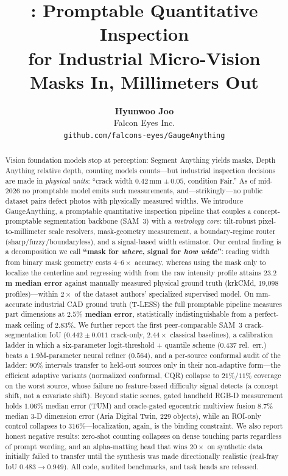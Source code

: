 \documentclass[11pt]{article}
\title{\textbf{\ours: Promptable Quantitative Inspection\\for Industrial Micro-Vision}\\
\large Masks In, Millimeters Out}
\author{%
  \textbf{Hyunwoo Joo}\\
  Falcon Eyes Inc.\\
  \texttt{github.com/falcons-eyes/GaugeAnything}
}
\date{}
\newcommand{\ours}{GaugeAnything}
\newcommand{\um}{\,\textmu m}
\begin{document}
\maketitle

\begin{abstract}
Vision foundation models stop at perception: Segment Anything yields masks, Depth Anything
relative depth, counting models counts---but industrial inspection decisions are made in
\emph{physical units}: ``crack width $0.42$\,mm $\pm\,0.05$, condition Fair.'' As of mid-2026 no
promptable model emits such measurements, and---strikingly---no public dataset pairs defect
photos with physically measured widths. We introduce \ours, a promptable quantitative
inspection pipeline that couples a concept-promptable segmentation backbone (SAM~3) with a
\emph{metrology core}: tilt-robust pixel-to-millimeter scale resolvers, mask-geometry
measurement, a boundary-regime router (sharp/fuzzy/boundaryless), and a signal-based width
estimator. Our central finding is a decomposition we call \textbf{``mask for \emph{where},
signal for \emph{how wide}''}: reading width from binary mask geometry costs $4$--$6\times$
accuracy, whereas using the mask only to localize the centerline and regressing width from
the raw intensity profile attains \textbf{$23.2$\um{} median error} against manually measured
physical ground truth (krkCMd, 19{,}098 profiles)---within $2\times$ of the dataset authors'
specialized supervised model. On mm-accurate industrial CAD ground truth (T-LESS) the full
promptable pipeline measures part dimensions at \textbf{$2.5\%$ median error}, statistically
indistinguishable from a perfect-mask ceiling of $2.83\%$. We further report the first
peer-comparable SAM~3 crack-segmentation IoU ($0.442\pm0.011$ crack-only, $2.44\times$
classical baselines), a calibration ladder in which a six-parameter logit-threshold +
quantile scheme ($0.437$ rel.\ err.) beats a $1.9$M-parameter neural refiner ($0.564$),
and a per-source conformal audit of the ladder: $90\%$ intervals transfer to held-out
sources only in their non-adaptive form---the efficient adaptive variants (normalized
conformal, CQR) collapse to $21\%$/$11\%$ coverage on the worst source, whose failure no
feature-based difficulty signal detects (a concept shift, not a covariate shift). Beyond
static scenes, gated handheld RGB-D measurement holds $1.06\%$ median error (TUM) and
oracle-gated egocentric multiview fusion $8.7\%$ median 3-D dimension error (Aria Digital
Twin, 229 objects), while an ROI-only control collapses to $316\%$---localization, again,
is the binding constraint. We also report honest negative results: zero-shot counting
collapses on dense touching parts regardless of prompt wording, and an alpha-matting head
that wins $20\times$ on synthetic data initially failed to transfer until the synthesis was
made directionally realistic (real-fray IoU $0.483\rightarrow0.949$). All code, audited
benchmarks, and task heads are released.
\end{abstract}
\end{document}
